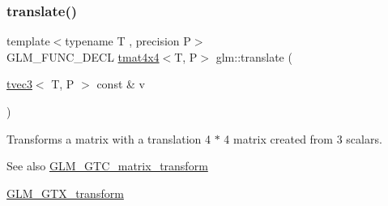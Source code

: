 \subsubsection{\texorpdfstring{translate()}{translate()}}
{\footnotesize\ttfamily template$<$typename T , precision P$>$ \\
G\+L\+M\+\_\+\+F\+U\+N\+C\+\_\+\+D\+E\+CL \hyperlink{structglm_1_1tmat4x4}{tmat4x4}$<$T, P$>$ glm\+::translate (\begin{DoxyParamCaption}\item[{\hyperlink{structglm_1_1tvec3}{tvec3}$<$ T, P $>$ const \&}]{v }\end{DoxyParamCaption})}

Transforms a matrix with a translation 4 $\ast$ 4 matrix created from 3 scalars. \begin{DoxySeeAlso}{See also}
\hyperlink{group__gtc__matrix__transform}{G\+L\+M\+\_\+\+G\+T\+C\+\_\+matrix\+\_\+transform} 

\hyperlink{group__gtx__transform}{G\+L\+M\+\_\+\+G\+T\+X\+\_\+transform} 
\end{DoxySeeAlso}
